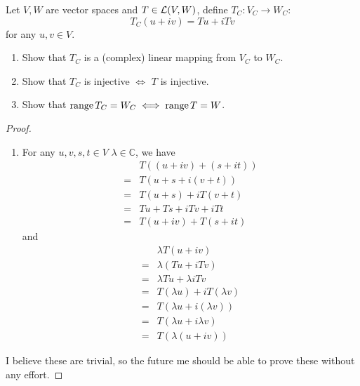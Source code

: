 \documentclass[../main.tex]{subfiles}
\begin{document}
\begin{exercise}
  Let $V, W$ are vector spaces and $T \in \mathcal{L}(V, W)$, define $T_C : V_C \rightarrow W_C$:
  \[
  T_C(u + iv) = Tu + iTv
  \]
  for any $u, v \in V$.

  \begin{enumerate}
    \item Show that $T_C$ is a (complex) linear mapping from $V_C$ to $W_C$.
    \item Show that $T_C$ is injective $\iff$ $T$ is injective.
    \item Show that $\operatorname{range} T_C = W_C \iff \operatorname{range} T = W$.
  \end{enumerate}
\end{exercise}
\begin{proof}
  ~
  \begin{enumerate}
    \item For any $u, v, s, t \in V$ $\lambda \in \mathbb{C}$, we have 
          \begin{align*}
             & T((u + iv) + (s + it)) \\
            =& T(u + s + i(v + t)) \\
            =& T(u + s) + iT(v + t) \\
            =& Tu + Ts + iTv + iTt \\
            =& T(u + iv) + T(s + it)
          \end{align*}
          and
          \begin{align*}
             & \lambda T(u + iv) \\
            =& \lambda (Tu + iTv) \\
            =& \lambda Tu + \lambda iTv \\
            =& T(\lambda u) + iT(\lambda v) \\
            =& T(\lambda u + i (\lambda v)) \\
            =& T(\lambda u + i \lambda v) \\
            =& T(\lambda (u + iv))
          \end{align*}
  \end{enumerate}

  I believe these are trivial, so the future me should be able to prove these without any effort.
\end{proof}
\end{document}
